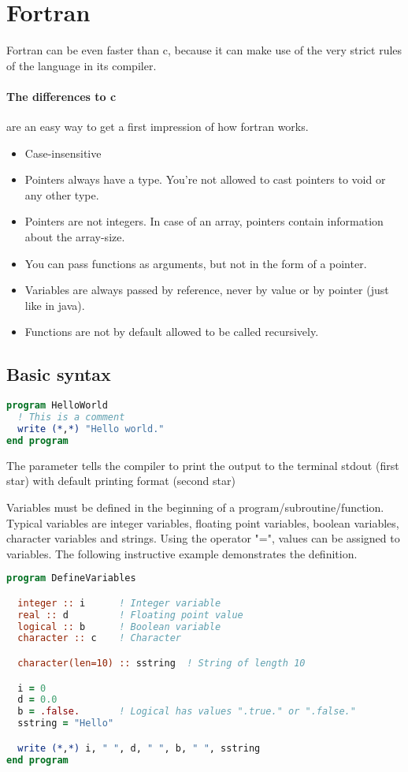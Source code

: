 \section{Fortran}

Fortran can be even faster than c, because it can make use of the very strict rules of the language in its compiler. 


\paragraph{The differences to c} are an easy way to get a first impression of how fortran works. 
\begin{itemize}
    \item Case-insensitive
    \item Pointers always have a type. You're not allowed to cast pointers to void or any other type. 
    \item Pointers are not integers. In case of an array, pointers contain information about the array-size. 
    \item You can pass functions as arguments, but not in the form of a pointer. 
    \item Variables are always passed by reference, never by value or by pointer (just like in java).
    \item Functions are not by default allowed to be called recursively. 
\end{itemize}

\subsection{Basic syntax}
\begin{lstlisting}[language=fortran]
program HelloWorld
  ! This is a comment
  write (*,*) "Hello world."
end program
\end{lstlisting}
The parameter \inlinecode{(*,*)} tells the compiler to print the output to the terminal stdout (first star) with default printing format (second star)

Variables must be defined in the beginning of a program/subroutine/function. Typical variables are integer variables, floating point variables, boolean variables, character variables and strings. Using the operator "=", values can be assigned to variables. The following instructive example demonstrates the definition.
\begin{lstlisting}[language=fortran]
program DefineVariables

  integer :: i      ! Integer variable
  real :: d         ! Floating point value
  logical :: b      ! Boolean variable
  character :: c    ! Character

  character(len=10) :: sstring  ! String of length 10

  i = 0
  d = 0.0
  b = .false.       ! Logical has values ".true." or ".false."
  sstring = "Hello"

  write (*,*) i, " ", d, " ", b, " ", sstring
end program
\end{lstlisting}

